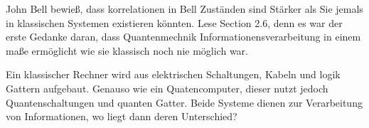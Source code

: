 John Bell bewie\ss , dass korrelationen in Bell Zust\"anden sind St\"arker als Sie jemals in klassischen Systemen existieren k\"onnten. Lese Section 2.6, denn es war der erste Gedanke daran, dass Quantenmechnik Informationensverarbeitung in einem ma\ss e erm\"oglicht wie sie klassisch noch nie m\"oglich war.

Ein klassischer Rechner wird aus elektrischen Schaltungen, Kabeln und logik Gattern aufgebaut. Genauso wie ein Quatencomputer, dieser nutzt jedoch Quantenschaltungen und quanten Gatter. Beide Systeme dienen zur Verarbeitung von Informationen, wo liegt dann deren Unterschied?

